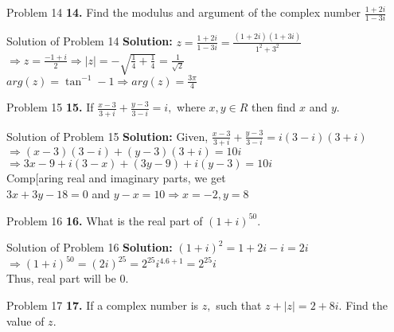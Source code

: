 \documentclass[aspectratio=169,8pt]{beamer}
\begin{document}
\begin{frame}{Problem 14}
  \textbf{14.} Find the modulus and argument of the complex number $\frac{1 + 2i}{1 - 3i}$
\end{frame}
\begin{frame}{Solution of Problem 14}
  \textbf{Solution:} $z = \frac{1 + 2i}{1 - 3i} = \frac{(1 + 2i)(1 + 3i)}{1^2 + 3^2}$\\
  \vspace*{0.2cm}
  $\Rightarrow z = \frac{-1 + i}{2} \Rightarrow |z| =- \sqrt{\frac{1}{4} + \frac{1}{4}} = \frac{1}{\sqrt{2}}$\\
  \vspace*{0.2cm}
  $arg(z) = \tan^{-1}-1 \Rightarrow arg(z) = \frac{3\pi}{4}$
\end{frame}
\begin{frame}{Problem 15}
  \textbf{15.} If $\frac{x - 3}{3 + i} + \frac{y - 3}{3 - i} = i,$ where $x, y \in R$ then find $x$ and $y.$
\end{frame}
\begin{frame}{Solution of Problem 15}
  \textbf{Solution:} Given, $\frac{x - 3}{3 + i} + \frac{y - 3}{3 - i} = i(3 - i)(3 + i)$\\
  \vspace*{0.2cm}
  $\Rightarrow (x - 3)(3 - i) + (y - 3)(3 + i) = 10i$\\
  \vspace*{0.2cm}
  $\Rightarrow 3x - 9 + i(3 - x) + (3y - 9) + i(y - 3) = 10i$\\
  \vspace*{0.2cm}
  Comp[aring real and imaginary parts, we get\\
    \vspace*{0.2cm}
    $3x + 3y - 18 = 0$ and $y - x = 10 \Rightarrow x = -2, y = 8$
\end{frame}
\begin{frame}{Problem 16}
  \textbf{16.} What is the real part of $(1 + i)^{50}.$
\end{frame}
\begin{frame}{Solution of Problem 16}
  \textbf{Solution:} $(1 + i)^2 = 1 + 2i - i = 2i$\\
  \vspace*{0.2cm}
  $\Rightarrow (1 + i)^{50} = (2i)^{25} = 2^{25}i^{4.6 + 1} = 2^{25}i$\\
  \vspace*{0.2cm}
  Thus, real part will be $0.$
\end{frame}
\begin{frame}{Problem 17}
  \textbf{17.} If a complex number is $z,$ such that $z + |z| = 2 + 8i.$ Find the value of $z.$
\end{frame}
\end{document}
